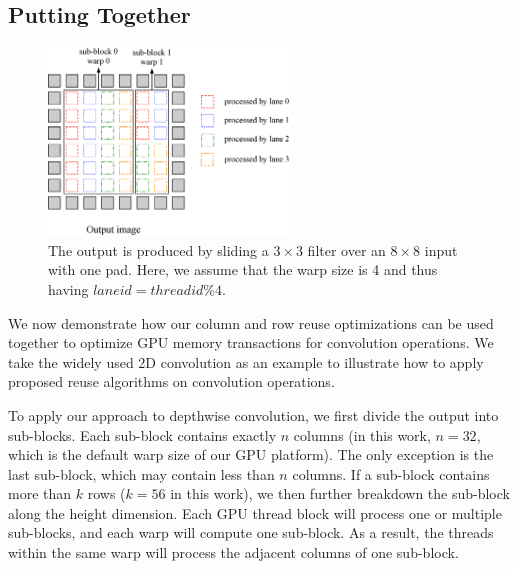 \subsection{Putting Together}
\label{sec:together}
\begin{figure}
	\centering
	\includegraphics[width=0.8\columnwidth,height=5cm]{./figure/overalldesign.eps} \caption{The output is produced by sliding a $3 \times
3$ filter over an $8 \times 8$ input with one pad. Here, we assume
that the warp size is 4 and thus having $laneid=threadid\%4$.} \label{fig:overalldesign}
\vspace{-2mm}
\end{figure}


We now demonstrate how our column and row reuse optimizations can be used together to optimize GPU memory transactions for convolution
operations. We take the widely used 2D convolution as an example to illustrate how to apply proposed reuse algorithms on convolution
operations.


To apply our approach to depthwise convolution, we first divide the output into sub-blocks. Each sub-block contains exactly $n$ columns (in this
work, $n = 32$, which is the default warp size of our GPU platform). The only exception is the last sub-block, which may contain less than
$n$ columns. If a sub-block contains more than $k$ rows ($k=56$ in this work), we then further breakdown the sub-block along the height
dimension. Each GPU thread block will process one or multiple sub-blocks, and each warp will compute one sub-block. As a
result, the threads within the same warp will process the adjacent columns of one sub-block.


